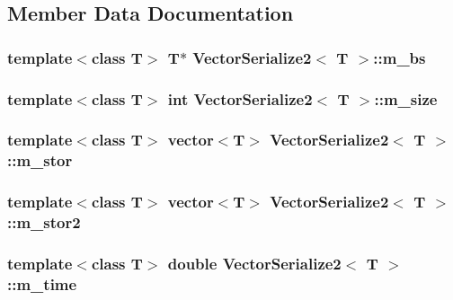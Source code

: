 \subsection{Member Data Documentation}
\hypertarget{classVectorSerialize2_aa0db99cb2a6c40c5d7338c7ca250bc00}{
\subsubsection[{m\-\_\-bs}]{\setlength{\rightskip}{0pt plus 5cm}template$<$class T$>$ T$\ast$ {\bf Vector\-Serialize2}$<$ T $>$\-::m\-\_\-bs}}\label{classVectorSerialize2_aa0db99cb2a6c40c5d7338c7ca250bc00}
\hypertarget{classVectorSerialize2_af8eaa31f7a05b4fefedf7c3aea69f89c}{
\subsubsection[{m\-\_\-size}]{\setlength{\rightskip}{0pt plus 5cm}template$<$class T$>$ int {\bf Vector\-Serialize2}$<$ T $>$\-::m\-\_\-size}}\label{classVectorSerialize2_af8eaa31f7a05b4fefedf7c3aea69f89c}
\hypertarget{classVectorSerialize2_ac7c35c9c34fcc9e1c20fc01704c4c92c}{
\subsubsection[{m\-\_\-stor}]{\setlength{\rightskip}{0pt plus 5cm}template$<$class T$>$ vector$<$T$>$ {\bf Vector\-Serialize2}$<$ T $>$\-::m\-\_\-stor}}\label{classVectorSerialize2_ac7c35c9c34fcc9e1c20fc01704c4c92c}
\hypertarget{classVectorSerialize2_a5305cb76c79ff91a0e2a05bb0b76b59c}{
\subsubsection[{m\-\_\-stor2}]{\setlength{\rightskip}{0pt plus 5cm}template$<$class T$>$ vector$<$T$>$ {\bf Vector\-Serialize2}$<$ T $>$\-::m\-\_\-stor2}}\label{classVectorSerialize2_a5305cb76c79ff91a0e2a05bb0b76b59c}
\hypertarget{classVectorSerialize2_ac58f92faa04b0256d02d007846d602b0}{
\subsubsection[{m\-\_\-time}]{\setlength{\rightskip}{0pt plus 5cm}template$<$class T$>$ double {\bf Vector\-Serialize2}$<$ T $>$\-::m\-\_\-time}}\label{classVectorSerialize2_ac58f92faa04b0256d02d007846d602b0}
